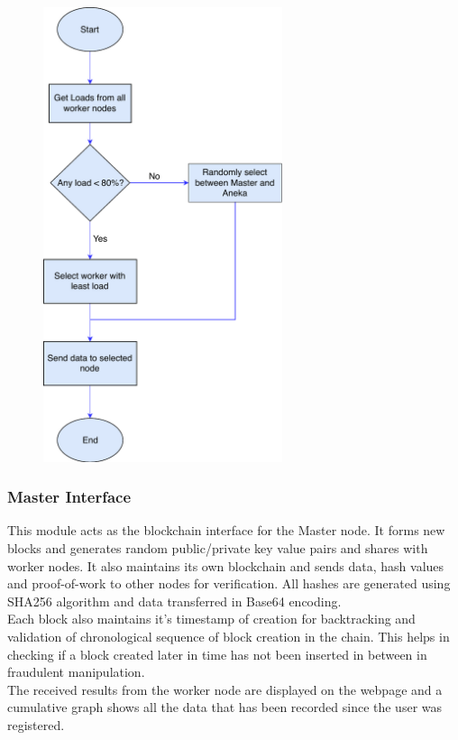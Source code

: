 \documentclass[AMA,STIX1COL]{WileyNJD-v2}
\begin{document}
\begin{figure}[h]
\centering
\includegraphics[width=7cm]{load-balancing}
\end{figure}

\subsubsection{Master Interface}
This module acts as the blockchain interface for the Master node. It forms new blocks and generates random public/private key value pairs and shares with worker nodes. It also maintains its own blockchain and sends data, hash values and proof-of-work to other nodes for verification. All hashes are generated using SHA256 algorithm and data transferred in Base64 encoding.\\ 
Each block also maintains it’s timestamp of creation for backtracking and validation of chronological sequence of block creation in the chain. This helps in checking if a block created later in time has not been inserted in between in fraudulent manipulation. \\
The received results from the worker node are displayed on the webpage and a cumulative graph shows all the data that has been recorded since the user was registered. 
\end{document}
